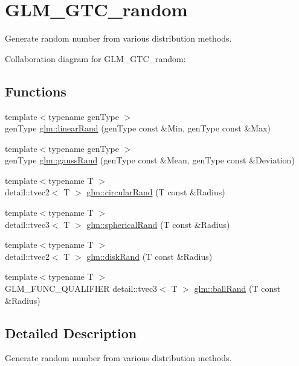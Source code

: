 \hypertarget{group__gtc__random}{}\section{G\+L\+M\+\_\+\+G\+T\+C\+\_\+random}
\label{group__gtc__random}


Generate random number from various distribution methods.  


Collaboration diagram for G\+L\+M\+\_\+\+G\+T\+C\+\_\+random\+:
\subsection*{Functions}
\begin{DoxyCompactItemize}
\item 
{\footnotesize template$<$typename gen\+Type $>$ }\\gen\+Type \hyperlink{group__gtc__random_ga4fbce21c9727ffcd7f19813d6d7d8024}{glm\+::linear\+Rand} (gen\+Type const \&Min, gen\+Type const \&Max)
\item 
{\footnotesize template$<$typename gen\+Type $>$ }\\gen\+Type \hyperlink{group__gtc__random_ga8cf40a2f2268b91103f763b6ea2c44d8}{glm\+::gauss\+Rand} (gen\+Type const \&Mean, gen\+Type const \&Deviation)
\item 
{\footnotesize template$<$typename T $>$ }\\detail\+::tvec2$<$ T $>$ \hyperlink{group__gtc__random_ga6e74477d1997a1bc2cf62bcc36167674}{glm\+::circular\+Rand} (T const \&Radius)
\item 
{\footnotesize template$<$typename T $>$ }\\detail\+::tvec3$<$ T $>$ \hyperlink{group__gtc__random_ga291f75129653fa6371d2d57d78f8aca6}{glm\+::spherical\+Rand} (T const \&Radius)
\item 
{\footnotesize template$<$typename T $>$ }\\detail\+::tvec2$<$ T $>$ \hyperlink{group__gtc__random_gaacf5ed0c8f984b4ca3004019c573dc51}{glm\+::disk\+Rand} (T const \&Radius)
\item 
{\footnotesize template$<$typename T $>$ }\\G\+L\+M\+\_\+\+F\+U\+N\+C\+\_\+\+Q\+U\+A\+L\+I\+F\+I\+E\+R detail\+::tvec3$<$ T $>$ \hyperlink{group__gtc__random_gae568d57f4e563044292385f6a5659d82}{glm\+::ball\+Rand} (T const \&Radius)
\end{DoxyCompactItemize}


\subsection{Detailed Description}
Generate random number from various distribution methods. 

